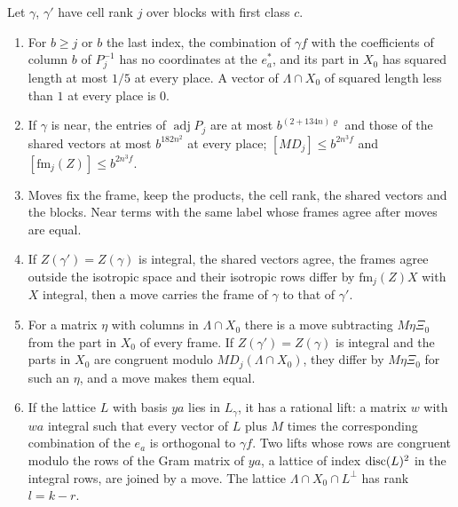 \begin{lemma}\label{lem:frame-moves}
Let $\gamma$, $\gamma'$ have cell rank $j$ over blocks with first class $c$.
\begin{enumerate}[label=\textup{(\alph*)}]
\item For $b\ge j$ or $b$ the last index, the combination of $\gamma f$ with the coefficients of column $b$ of $P_j^{-1}$ has no coordinates at the $e^*_a$, and its part in $X_0$ has squared length at most $1/5$ at every
place. A vector of $\Lambda\cap X_0$ of squared length less than $1$ at every place is $0$.
\item If $\gamma$ is near, the entries of $\operatorname{adj}P_j$ are at most $b^{(2+134n)\varrho}$ and those of the shared vectors at most $b^{182n^2}$ at every place; $[MD_j]\le b^{2n^3f}$ and $[\mathrm{fm}_j(Z)]\le b^{2n^3f}$.
\item Moves fix the frame, keep the products, the cell rank, the shared vectors and the blocks. Near terms with the same label whose frames agree after moves are equal.
\item If $Z(\gamma')=Z(\gamma)$ is integral, the shared vectors agree, the frames agree outside the isotropic space and their isotropic rows differ by $\mathrm{fm}_j(Z)X$ with $X$ integral, then a move carries the frame of $\gamma$ to
that of $\gamma'$.
\item For a matrix $\eta$ with columns in $\Lambda\cap X_0$ there is a move subtracting $M\eta\Xi_0$ from the part in $X_0$ of every frame. If $Z(\gamma')=Z(\gamma)$ is integral and the parts in $X_0$ are congruent modulo
$MD_j(\Lambda\cap X_0)$, they differ by $M\eta\Xi_0$ for such an $\eta$, and a move makes them equal.
\item If the lattice $L$ with basis $ya$ lies in $L_\gamma$, it has a rational lift: a matrix $w$ with $wa$ integral such that every vector of $L$ plus $M$ times the corresponding combination of the $e_a$ is orthogonal to $\gamma f$.
Two lifts whose rows are congruent modulo the rows of the Gram matrix of $ya$, a lattice of index $\operatorname{disc}(L)^2$ in the integral rows, are joined by a move. The lattice $\Lambda\cap X_0\cap L^\perp$ has rank $l=k-r$.
\end{enumerate}
\end{lemma}
